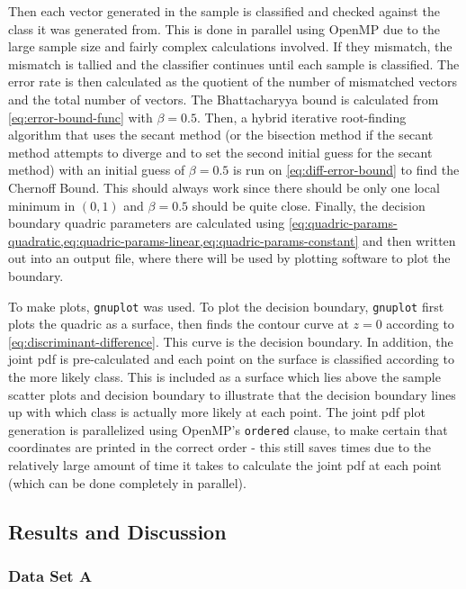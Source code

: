 \documentclass[headings=optiontoheadandtoc,listof=totoc,parskip=full]{scrartcl}
\begin{document}
Then each vector generated in the sample is classified and checked against the class it was generated from. This is done in parallel using OpenMP due to the large sample size and fairly complex calculations involved. If they mismatch, the mismatch is tallied and the classifier continues until each sample is classified. The error rate is then calculated as the quotient of the number of mismatched vectors and the total number of vectors. The Bhattacharyya bound is calculated from \cref{eq:error-bound-func} with $\beta = 0.5$. Then, a hybrid iterative root-finding algorithm that uses the secant method (or the bisection method if the secant method attempts to diverge and to set the second initial guess for the secant method) with an initial guess of $\beta = 0.5$ is run on \cref{eq:diff-error-bound} to find the Chernoff Bound. This should always work since there should be only one local minimum in $(0,1)$ and $\beta = 0.5$ should be quite close. Finally, the decision boundary quadric parameters are calculated using \cref{eq:quadric-params-quadratic,eq:quadric-params-linear,eq:quadric-params-constant} and then written out into an output file, where there will be used by plotting software to plot the boundary.

To make plots, \texttt{gnuplot} was used. To plot the decision boundary, \texttt{gnuplot} first plots the quadric as a surface, then finds the contour curve at $z = 0$ according to \cref{eq:discriminant-difference}. This curve is the decision boundary. In addition, the joint pdf is pre-calculated and each point on the surface is classified according to the more likely class. This is included as a surface which lies above the sample scatter plots and decision boundary to illustrate that the decision boundary lines up with which class is actually more likely at each point. The joint pdf plot generation is parallelized using OpenMP's \texttt{ordered} clause, to make certain that coordinates are printed in the correct order - this still saves times due to the relatively large amount of time it takes to calculate the joint pdf at each point (which can be done completely in parallel).

\subsection{Results and Discussion}

\subsubsection{Data Set A}
\label{sec:results-bayes-a}
\end{document}
